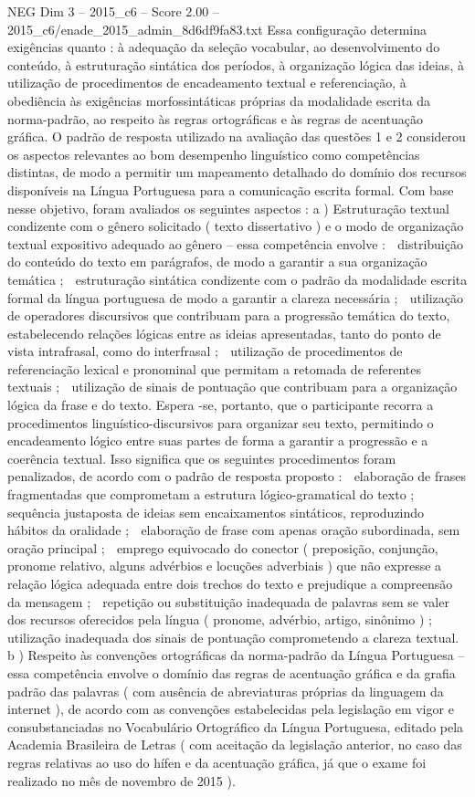 \begin{textsample}{NEG Dim 3 – 2015\_c6 – Score 2.00 – 2015\_c6/enade\_2015\_admin\_8d6df9fa83.txt}
Essa configuração determina exigências quanto : à adequação da seleção vocabular, ao desenvolvimento do conteúdo, à estruturação sintática dos períodos, à organização lógica das ideias, à utilização de procedimentos de encadeamento textual e referenciação, à obediência às exigências morfossintáticas próprias da modalidade escrita da norma-padrão, ao respeito às regras ortográficas e às regras de acentuação gráfica.
O padrão de resposta utilizado na avaliação das questões 1 e 2 considerou os aspectos relevantes ao bom desempenho linguístico como competências distintas, de modo a permitir um mapeamento detalhado do domínio dos recursos disponíveis na Língua Portuguesa para a comunicação escrita formal.
Com base nesse objetivo, foram avaliados os seguintes aspectos : a ) Estruturação textual condizente com o gênero solicitado ( texto dissertativo ) e o modo de organização textual expositivo adequado ao gênero – essa competência envolve :  distribuição do conteúdo do texto em parágrafos, de modo a garantir a sua organização temática ;  estruturação sintática condizente com o padrão da modalidade escrita formal da língua portuguesa de modo a garantir a clareza necessária ;  utilização de operadores discursivos que contribuam para a progressão temática do texto, estabelecendo relações lógicas entre as ideias apresentadas, tanto do ponto de vista intrafrasal, como do interfrasal ;  utilização de procedimentos de referenciação lexical e pronominal que permitam a retomada de referentes textuais ;  utilização de sinais de pontuação que contribuam para a organização lógica da frase e do texto.
Espera -se, portanto, que o participante recorra a procedimentos linguístico-discursivos para organizar seu texto, permitindo o encadeamento lógico entre suas partes de forma a garantir a progressão e a coerência textual.
Isso significa que os seguintes procedimentos foram penalizados, de acordo com o padrão de resposta proposto :  elaboração de frases fragmentadas que comprometam a estrutura lógico-gramatical do texto ;  sequência justaposta de ideias sem encaixamentos sintáticos, reproduzindo hábitos da oralidade ;  elaboração de frase com apenas oração subordinada, sem oração principal ;  emprego equivocado do conector ( preposição, conjunção, pronome relativo, alguns advérbios e locuções adverbiais ) que não expresse a relação lógica adequada entre dois trechos do texto e prejudique a compreensão da mensagem ;  repetição ou substituição inadequada de palavras sem se valer dos recursos oferecidos pela língua ( pronome, advérbio, artigo, sinônimo ) ;  utilização inadequada dos sinais de pontuação comprometendo a clareza textual. b ) Respeito às convenções ortográficas da norma-padrão da Língua Portuguesa – essa competência envolve o domínio das regras de acentuação gráfica e da grafia padrão das palavras ( com ausência de abreviaturas próprias da linguagem da internet ), de acordo com as convenções estabelecidas pela legislação em vigor e consubstanciadas no Vocabulário Ortográfico da Língua Portuguesa, editado pela Academia Brasileira de Letras ( com aceitação da legislação anterior, no caso das regras relativas ao uso do hífen e da acentuação gráfica, já que o exame foi realizado no mês de novembro de 2015 ).

\end{textsample}
